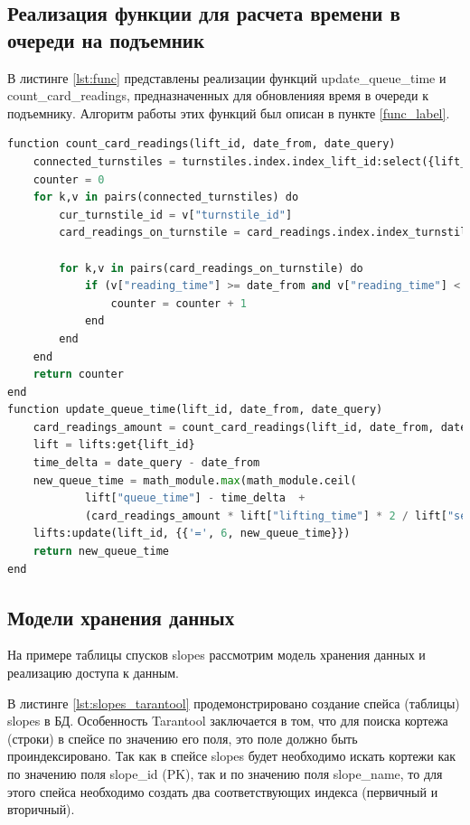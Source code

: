 \subsection{Реализация функции для расчета времени в очереди на подъемник}

В листинге \ref{lst:func} представлены реализации функций update\_queue\_time и count\_card\_readings, предназначенных для обновленияя время в очереди к подъемнику. Алгоритм работы этих функций был описан в пункте \ref{func_label}.

\captionsetup{justification=centering,singlelinecheck=off}
\begin{lstlisting}[label=lst:func, caption=Функции update\_queue\_time и count\_card\_readings, language=python]
function count_card_readings(lift_id, date_from, date_query)
	connected_turnstiles = turnstiles.index.index_lift_id:select({lift_id})
	counter = 0
	for k,v in pairs(connected_turnstiles) do
		cur_turnstile_id = v["turnstile_id"]
		card_readings_on_turnstile = card_readings.index.index_turnstile:select({cur_turnstile_id})
		
		for k,v in pairs(card_readings_on_turnstile) do
			if (v["reading_time"] >= date_from and v["reading_time"] < date_query) then
				counter = counter + 1
			end
		end
	end
	return counter
end
function update_queue_time(lift_id, date_from, date_query)
	card_readings_amount = count_card_readings(lift_id, date_from, date_query)
	lift = lifts:get{lift_id}
	time_delta = date_query - date_from
	new_queue_time = math_module.max(math_module.ceil(
			lift["queue_time"] - time_delta  + 
			(card_readings_amount * lift["lifting_time"] * 2 / lift["seats_amount"])), 0)
	lifts:update(lift_id, {{'=', 6, new_queue_time}})
	return new_queue_time
end
\end{lstlisting}

\subsection{Модели хранения данных}

На примере таблицы спусков slopes рассмотрим модель хранения данных и реализацию доступа к данным.

В листинге \ref{lst:slopes_tarantool} продемонстрировано создание спейса (таблицы) slopes в БД. Особенность Tarantool заключается в том, что для поиска кортежа (строки) в спейсе по значению его поля, это поле должно быть проиндексировано. Так как в спейсе slopes будет необходимо искать кортежи как по значению поля slope\_id (PK), так и по значению поля slope\_name, то для этого спейса необходимо создать два соответствующих индекса (первичный и вторичный).

